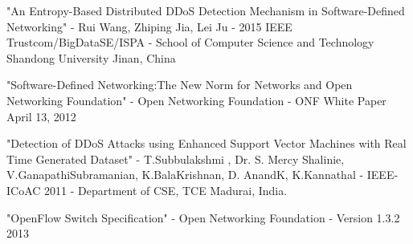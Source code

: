 \documentclass[12pt,a4paper,final]{article}
\begin{document}
\begin{flushleft}
\begin{enumerate}[label={[\arabic*]}]
\item 
"An Entropy-Based Distributed DDoS Detection Mechanism in Software-Defined Networking" - Rui Wang, Zhiping Jia, Lei Ju - 2015 IEEE Trustcom/BigDataSE/ISPA - School of Computer Science and Technology Shandong University Jinan, China

\item 
"Software-Defined Networking:The New Norm for Networks and 
Open Networking Foundation" - Open Networking Foundation - ONF White Paper April 13, 2012

\item 
"Detection of DDoS Attacks using Enhanced Support Vector Machines with Real Time Generated Dataset" - T.Subbulakshmi , Dr. S. Mercy Shalinie, V.GanapathiSubramanian, K.BalaKrishnan, D. AnandK, K.Kannathal - IEEE-ICoAC 2011 - Department of CSE, TCE Madurai, India.

\item
"OpenFlow Switch Specification" - Open Networking Foundation - Version 1.3.2 2013
\end{enumerate}
\end{flushleft}
\end{document}
